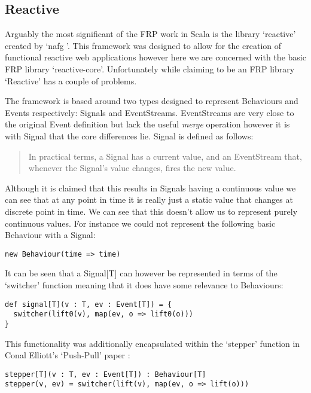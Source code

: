     \subsection{Reactive}
      Arguably the most significant of the FRP work in Scala is the library `reactive' created by `nafg \cite{Nafg}'. This    
      framework was designed to allow for the creation of functional reactive web applications however here we are concerned 
      with the basic FRP library `reactive-core'. Unfortunately while claiming to be an FRP library `Reactive'
      has a couple of problems.
      
      The framework is based around two types designed to represent Behaviours and Events respectively: Signals
      and EventStreams. EventStreams are very close to the original Event definition but lack the
      useful \emph{merge} operation however it is with Signal that the core differences lie. Signal is defined as follows:
      
      \begin{quote}
        In practical terms, a Signal has a current value, and an EventStream that, whenever the Signal's value changes,     
        fires the new value.
      \end{quote}  
      
      Although it is claimed that this results in Signals having a continuous value we can see
      that at any point in time it is really just a static value that changes at discrete point in
      time. We can see that this doesn't allow us to represent purely continuous values. For instance
      we could not represent the following basic Behaviour with a Signal:
      
\begin{verbatim}
new Behaviour(time => time)
\end{verbatim}

      It can be seen that a Signal[T] can however be represented in terms
      of the `switcher' function meaning that it does have some relevance to Behaviours:
      
\begin{verbatim}
def signal[T](v : T, ev : Event[T]) = {
  switcher(lift0(v), map(ev, o => lift0(o)))
}
\end{verbatim}  

      This functionality was additionally encapsulated within the `stepper' function in Conal Elliott's
      `Push-Pull' paper \cite{Elliott2009}:

\begin{verbatim}
stepper[T](v : T, ev : Event[T]) : Behaviour[T]
stepper(v, ev) = switcher(lift(v), map(ev, o => lift(o)))
\end{verbatim} 

